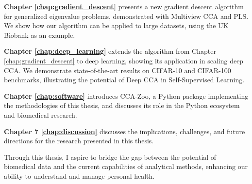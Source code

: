 \textbf{Chapter \ref{chap:gradient_descent}} presents a new gradient descent algorithm for generalized eigenvalue problems, demonstrated with Multiview CCA and PLS. We show how our algorithm can be applied to large datasets, using the UK Biobank as an example.

\textbf{Chapter \ref{chap:deep_learning}} extends the algorithm from Chapter \ref{chap:gradient_descent} to deep learning, showing its application in scaling deep CCA. We demonstrate state-of-the-art results on CIFAR-10 and CIFAR-100 benchmarks, illustrating the potential of Deep CCA in Self-Supervised Learning.

\textbf{Chapter \ref{chap:software}} introduces CCA-Zoo, a Python package implementing the methodologies of this thesis, and discusses its role in the Python ecosystem and biomedical research.

\textbf{Chapter 7 \ref{chap:discussion}} discusses the implications, challenges, and future directions for the research presented in this thesis.

Through this thesis, I aspire to bridge the gap between the potential of biomedical data and the current capabilities of analytical methods, enhancing our ability to understand and manage personal health.
